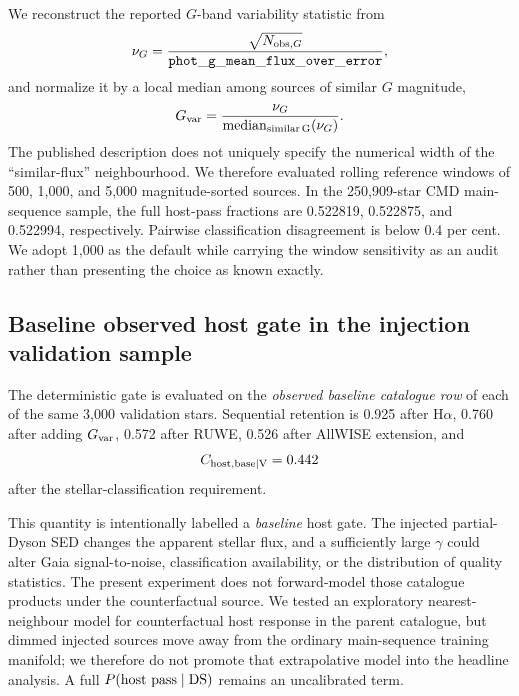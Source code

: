\documentclass[fleqn,usenatbib]{mnras}
\begin{document}
We reconstruct the reported $G$-band variability statistic from
\begin{equation}
\nu_G=\frac{\sqrt{N_{{\rm obs},G}}}
{{\tt phot\_g\_mean\_flux\_over\_error}},
\end{equation}
and normalize it by a local median among sources of similar $G$ magnitude,
\begin{equation}
G_{\rm var}=\frac{\nu_G}
{\operatorname{median}_{\rm similar\,G}(\nu_G)}.
\end{equation}
The published description does not uniquely specify the numerical width of the ``similar-flux'' neighbourhood. We therefore evaluated rolling reference windows of 500, 1,000, and 5,000 magnitude-sorted sources. In the 250,909-star CMD main-sequence sample, the full host-pass fractions are 0.522819, 0.522875, and 0.522994, respectively. Pairwise classification disagreement is below 0.4 per cent. We adopt 1,000 as the default while carrying the window sensitivity as an audit rather than presenting the choice as known exactly.

\subsection{Baseline observed host gate in the injection validation sample}

The deterministic gate is evaluated on the \emph{observed baseline catalogue row} of each of the same 3,000 validation stars. Sequential retention is 0.925 after H$\alpha$, 0.760 after adding $G_{\rm var}$, 0.572 after RUWE, 0.526 after AllWISE extension, and
\begin{equation}
C_{\rm host,base\mid V}=0.442
\end{equation}
after the stellar-classification requirement.

This quantity is intentionally labelled a \emph{baseline} host gate. The injected partial-Dyson SED changes the apparent stellar flux, and a sufficiently large $\gamma$ could alter Gaia signal-to-noise, classification availability, or the distribution of quality statistics. The present experiment does not forward-model those catalogue products under the counterfactual source. We tested an exploratory nearest-neighbour model for counterfactual host response in the parent catalogue, but dimmed injected sources move away from the ordinary main-sequence training manifold; we therefore do not promote that extrapolative model into the headline analysis. A full $P({\rm host\ pass}\mid{\rm DS})$ remains an uncalibrated term.
\end{document}
